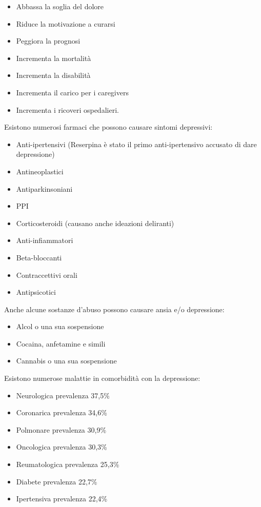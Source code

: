 \documentclass[]{article}
\begin{document}
\begin{itemize}
\item
  Abbassa la soglia del dolore
\item
  Riduce la motivazione a curarsi
\item
  Peggiora la prognosi
\item
  Incrementa la mortalità
\item
  Incrementa la disabilità
\item
  Incrementa il carico per i caregivers
\item
  Incrementa i ricoveri ospedalieri.
\end{itemize}

Esistono numerosi farmaci che possono causare sintomi depressivi:

\begin{itemize}
\item
  Anti-ipertensivi (Reserpina è stato il primo anti-ipertensivo accusato
  di dare depressione)
\item
  Antineoplastici
\item
  Antiparkinsoniani
\item
  PPI
\item
  Corticosteroidi (causano anche ideazioni deliranti)
\item
  Anti-infiammatori
\item
  Beta-bloccanti
\item
  Contraccettivi orali
\item
  Antipsicotici
\end{itemize}

Anche alcune sostanze d'abuso possono causare ansia e/o depressione:

\begin{itemize}
\item
  Alcol o una sua sospensione
\item
  Cocaina, anfetamine e simili
\item
  Cannabis o una sua sospensione
\end{itemize}

Esistono numerose malattie in comorbidità con la depressione:

\begin{itemize}
\item
  Neurologica prevalenza 37,5\%
\item
  Coronarica prevalenza 34,6\%
\item
  Polmonare prevalenza 30,9\%
\item
  Oncologica prevalenza 30,3\%
\item
  Reumatologica prevalenza 25,3\%
\item
  Diabete prevalenza 22,7\%
\item
  Ipertensiva prevalenza 22,4\%
\end{itemize}
\end{document}
